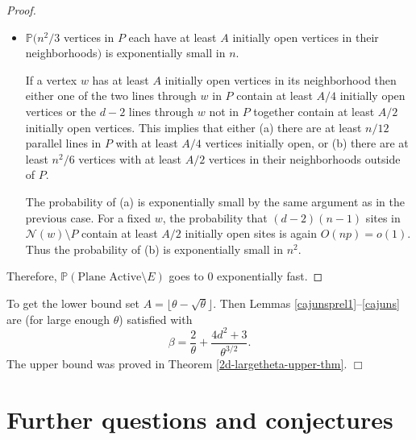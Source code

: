 \documentclass{amsart}
\newcommand{\prob}{\mathbb{P}}
\newcommand{\D}{\text{Plane Active}}
\newcommand{\threshold}{\theta}
\newcommand{\plane}{P}
\numberwithin{equation}{section}
\theoremstyle{definition}
\theoremstyle{remark}
\newenvironment{pfofthm}[1]
{\par\vskip2\parsep\noindent{\sc Proof of\ #1. }}{{\hfill
$\Box$}
\par\vskip2\parsep}
\begin{document}
\begin{proof}
\begin{itemize}
\item  $\prob(n^2/3$ vertices in $\plane$ each have at least $A$ initially open vertices 
in their neighborhoods$)$ is exponentially small in $n$. 

If a vertex $w$ has at least $A$ initially open vertices in its neighborhood  
then either one of the two lines through $w$ in $\plane$ contain at least $A/4$  
initially open vertices or the $d-2$ lines through $w$ not in $\plane$ together  
contain at least $A/2$ initially open vertices.
This implies that either (a) there are at least $n/12$ parallel lines in $\plane$ with at least $A/4$ vertices initially open, or (b) there are at least $n^2/6$ vertices with at 
least $A/2$ vertices in their neighborhoods outside of 
$\plane$.  

The probability of (a) is exponentially small by the same argument as in the previous case. 
For a fixed $w$, the probability that $(d-2)(n-1)$ sites in $\mathcal{N}(w)\setminus \plane$ 
contain at least $A/2$ initially open sites 
is again $O(np)=o(1)$. Thus the probability of (b) is exponentially small in $n^2$. 

\begin{comment}
The probability of the first is at most
$$2{n \choose n/12}\left({n \choose A/4}p^{A/4}\right)^{n/12}\leq 
2\cdot 2^n\left(n^{-\beta A/4}\right)^{n/12}\leq n^{-cn}=o\left(n^{-(d-2)}\right)$$
and the second has probability at most
$$ {n^2 \choose n^2/6}\left({dn \choose A/2}p^{A/2}\right)^{n^2/6}\leq 
c \cdot 2^{n^2}\left(n^{-\beta A/2}\right)^{n^2/6}\leq n^{-cn^2}=o\left(n^{-(d-2)}\right).$$
\end{comment}
\end{itemize}
Therefore,  $\prob(\D \setminus E)$ goes to 0 exponentially fast.
\end{proof}

\begin{pfofthm}{Theorem \ref{epl}} To get the lower bound
set $A=\lfloor \threshold -\sqrt{\threshold}\rfloor$. Then Lemmas \ref{cajunsprel1}--\ref{cajuns}
are (for large enough $\theta$) satisfied with
$$\beta = \frac{2}{\threshold} + \frac{4d^2 + 3}{\threshold^{3/2}}.$$
The upper bound was proved in Theorem \ref{2d-largetheta-upper-thm}. 
\end{pfofthm}

\section{Further questions and conjectures}
\label{open}
\end{document}
